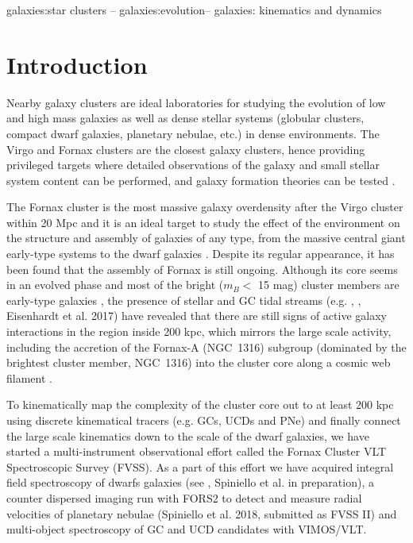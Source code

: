\documentclass[usenatbib]{mnras}
\begin{document}
\begin{keywords}
galaxies:star clusters -- galaxies:evolution-- galaxies: kinematics and dynamics
\end{keywords}

\section{Introduction}

Nearby galaxy clusters are ideal laboratories for studying the evolution of
low and high mass galaxies as well as dense stellar systems (globular
clusters, compact dwarf galaxies, planetary nebulae, etc.) in dense environments.
The Virgo and Fornax clusters are the closest galaxy clusters, hence providing
privileged targets where detailed observations of the galaxy and small stellar
system content can be performed, and galaxy formation theories can be tested \citep[e.g.,][]{Strader11}.

The Fornax cluster is the most massive galaxy overdensity after the Virgo cluster
within 20 Mpc and it is an ideal target to study the effect of the environment
on the structure and assembly of galaxies of any type, from the massive central
giant early-type systems to the dwarf galaxies \citep[e.g.,][]{Ferguson89, munoz15, Iodice16, venhola17, Eigenthaler18}. Despite its regular appearance,
it has been found that the assembly of Fornax is still ongoing.
Although its core seems in an evolved phase \citep{Grillmair94,Jordan07}
and most of the bright ($m_B < $  15 mag) cluster members are
early-type galaxies \citep{Ferguson89}, the presence of stellar and GC tidal
streams (e.g. \citealt{Iodice16}, \citealt{DAbrusco16}, Eisenhardt et al.
2017) have revealed that there are still signs of active galaxy interactions in
the region inside 200 kpc, which mirrors the large scale activity, including
the accretion of the Fornax-A (NGC~1316) subgroup (dominated by the brightest
cluster member, NGC~1316) into the cluster core along a
cosmic web filament \citep{Drinkwater00,Scharf05}.

To kinematically map the complexity of the cluster core out to at least 200 kpc
using discrete kinematical tracers (e.g. GCs, UCDs and PNe) and finally connect the
large scale kinematics down to the scale of the dwarf galaxies, we have started
a multi-instrument observational effort called the Fornax Cluster VLT
Spectroscopic Survey (FVSS). As a part of this effort we have acquired integral
field spectroscopy of dwarfs galaxies (see \citealt{mentz16}, Spiniello et al.
in preparation), a counter dispersed imaging run with FORS2 to detect and
measure radial velocities of planetary nebulae (Spiniello et al. 2018,
submitted as FVSS II) and multi-object spectroscopy of GC and UCD candidates
with VIMOS/VLT.
\end{document}

